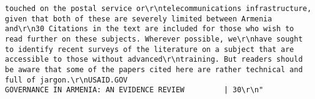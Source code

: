 \documentclass[
]{article}
\begin{document}
\begin{verbatim}
touched on the postal service or\r\ntelecommunications infrastructure, given that both of these are severely limited between Armenia and\r\n30 Citations in the text are included for those who wish to read further on these subjects. Wherever possible, we\r\nhave sought to identify recent surveys of the literature on a subject that are accessible to those without advanced\r\ntraining. But readers should be aware that some of the papers cited here are rather technical and full of jargon.\r\nUSAID.GOV                                                       GOVERNANCE IN ARMENIA: AN EVIDENCE REVIEW         | 30\r\n"                                                                                                                                                                                                                                                                                                                                                                                                                                                                                                                                                                                                                                                                                                                                                                                                                                                                                                                                                                                                                                                                                                                                                  

\end{verbatim}
\end{document}
